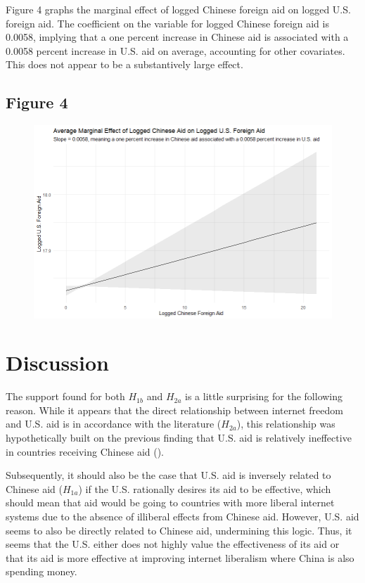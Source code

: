 \documentclass[12pt]{article}
\begin{document}
\pagebreak
Figure 4 graphs the marginal effect of logged Chinese foreign aid on logged U.S. foreign aid. The coefficient on the variable for logged Chinese foreign aid is 0.0058, implying that a one percent increase in Chinese aid is associated with a 0.0058 percent increase in U.S. aid on average, accounting for other covariates. This does not appear to be a substantively large effect.

\subsection*{Figure 4}
\begin{figure}[htbp]
    \includegraphics[scale=0.7]{628plot2.png}
\end{figure}
\pagebreak 

\section*{Discussion}
The support found for both $H_{1b}$ and $H_{2a}$ is a little surprising for the following reason. While it appears that the direct relationship between internet freedom and U.S. aid is in accordance with the literature ($H_{2a}$), this relationship was hypothetically built on the previous finding that U.S. aid is relatively ineffective in countries receiving Chinese aid (\cite{dreher2021}). 

Subsequently, it should also be the case that U.S. aid is inversely related to Chinese aid ($H_{1a}$) if the U.S. rationally desires its aid to be effective, which should mean that aid would be going to countries with more liberal internet systems due to the absence of illiberal effects from Chinese aid. However, U.S. aid seems to also be directly related to Chinese aid, undermining this logic. Thus, it seems that the U.S. either does not highly value the effectiveness of its aid or that its aid is more effective at improving internet liberalism where China is also spending money.
\end{document}
